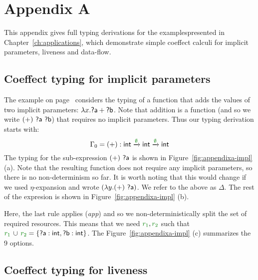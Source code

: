 
\chapter{Appendix A} 
\label{ch:appendix} 

This appendix gives full typing derivations for the examplespresented in Chapter~\ref{ch:applications},
which demonstrate simple coeffect calculi for implicit parameters, liveness and data-flow.


\section{Coeffect typing for implicit parameters}
\label{sec:appendixa-implicit} 

The example on page~\pageref{pg:applications-flat-paramsex} considers the typing of a function that
adds the values of two implicit parameters: $\lambda x.\ident{?a} + \ident{?b}$. Note that addition
is a function (and so we write $(+)~\ident{?a}~\ident{?b}$) that requires no implicit parameters.
Thus our typing derivation starts with: 
%
\begin{equation*}
\Gamma_0 = (+):\ident{int}\xrightarrow{\cclrd{\emptyset}}\ident{int}\xrightarrow{\cclrd{\emptyset}}\ident{int}
\end{equation*}
%
The typing for the sub-expression $(+)~\ident{?a}$ is shown in Figure~\ref{fig:appendixa-impl} (a).
Note that the resulting function does not require any implicit parameters, so there is no non-determinism so far.
It is worth noting that this would change if we used $\eta$-expansion and wrote $(\lambda y.(+)~\ident{?a})$.
We refer to the above as $\Delta$. The rest of the expresion is shown in Figure~\ref{fig:appendixa-impl} (b).

Here, the last rule applies (\emph{app}) and so we non-deterministically split the set of required resources.
This means that we need $\cclrd{r_1}, \cclrd{r_2}$ such that $\cclrd{r_1}\,\cup\,\cclrd{r_2}=\{\ident{?a}:\ident{int}, \ident{?b}:\ident{int} \}$.
The Figure~\ref{fig:appendixa-impl} (c) summarizes the 9 options.


\section{Coeffect typing for liveness}
\label{sec:appendixa-liveness} 

